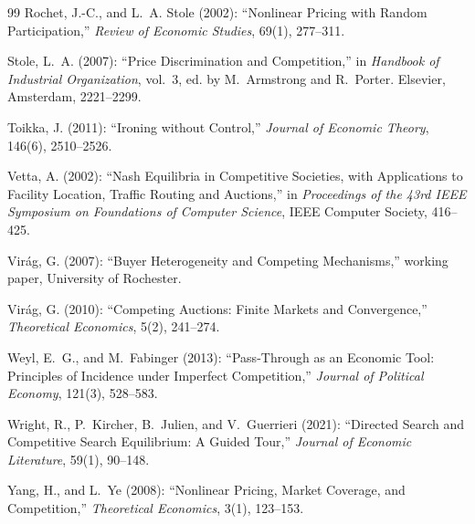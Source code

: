 \documentclass[12pt]{article}
\theoremstyle{mystyle}
\theoremstyle{mystyle2}
\newcommand{\1}{\mathbf{1}}
\begin{document}
\begin{thebibliography}{99}
 Rochet, J.-C., and L.~A. Stole (2002): ``Nonlinear Pricing with Random Participation,'' \emph{Review of Economic Studies}, 69(1), 277--311.

 Stole, L.~A. (2007): ``Price Discrimination and Competition,'' in \emph{Handbook of Industrial Organization}, vol.~3, ed. by M.~Armstrong and R.~Porter. Elsevier, Amsterdam, 2221--2299.

 Toikka, J. (2011): ``Ironing without Control,'' \emph{Journal of Economic Theory}, 146(6), 2510--2526.

 Vetta, A. (2002): ``Nash Equilibria in Competitive Societies, with Applications to Facility Location, Traffic Routing and Auctions,'' in \emph{Proceedings of the 43rd IEEE Symposium on Foundations of Computer Science}, IEEE Computer Society, 416--425.

 Vir{\'a}g, G. (2007): ``Buyer Heterogeneity and Competing Mechanisms,'' working paper, University of Rochester.

 Vir{\'a}g, G. (2010): ``Competing Auctions: Finite Markets and Convergence,'' \emph{Theoretical Economics}, 5(2), 241--274.

 Weyl, E.~G., and M.~Fabinger (2013): ``Pass-Through as an Economic Tool: Principles of Incidence under Imperfect Competition,'' \emph{Journal of Political Economy}, 121(3), 528--583.

 Wright, R., P.~Kircher, B.~Julien, and V.~Guerrieri (2021): ``Directed Search and Competitive Search Equilibrium: A Guided Tour,'' \emph{Journal of Economic Literature}, 59(1), 90--148.

 Yang, H., and L.~Ye (2008): ``Nonlinear Pricing, Market Coverage, and Competition,'' \emph{Theoretical Economics}, 3(1), 123--153.

\end{thebibliography}
\end{document}
